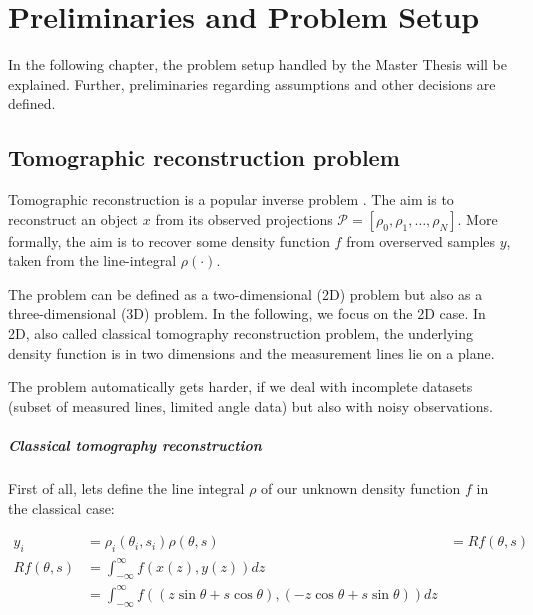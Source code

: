 \chapter{Preliminaries and Problem Setup}
\label{sec:preliminariesProblem}


In the following chapter, the problem setup handled by the Master Thesis will be explained.
Further, preliminaries regarding assumptions and other decisions are defined.

\section{Tomographic reconstruction problem}
\label{sec:reconstructionProblemCT}
Tomographic reconstruction\cite{tomographicReconstruction} is a popular inverse problem \cite{tomographicReconstruction}. 
The aim is to reconstruct an object $x$ from its observed projections $\mathcal{P}=[\rho_0, \rho_1, \dots, \rho_N]$.
More formally, the aim is to recover some density function $f$ from overserved samples $y$, taken from the line-integral $\rho(\cdot)$.

The problem can be defined as a two-dimensional (2D) problem but also as a three-dimensional (3D) problem. 
In the following, we focus on the 2D case.
In 2D, also called classical tomography reconstruction problem, the underlying density function is in two dimensions and the measurement lines lie on a plane.

The problem automatically gets harder, if we deal with incomplete datasets (subset of measured lines, limited angle data) but also with noisy observations.

\paragraph{Classical tomography reconstruction}

First of all, lets define the line integral $\rho$ of our unknown density function $f$ in the classical case:

\begin{equation}
    \begin{aligned}
        y_i &= \rho_i (\theta_i, s_i)
        \rho(\theta, s)   &=  R f(\theta, s) \\
        R f(\theta, s) &=  \int_{-\infty}^{\infty} f(x(z), y(z)) dz \\
        &= \int_{-\infty}^{\infty} f((z \sin \theta + s \cos \theta), (-z \cos \theta + s \sin \theta)) dz \\
    \end{aligned}
\end{equation}

